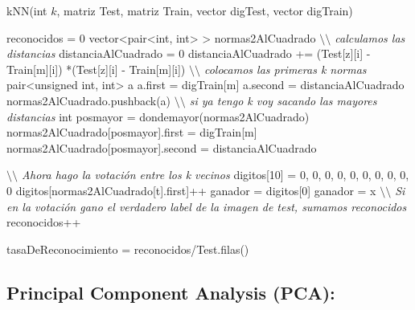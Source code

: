 \begin{algorithm}[H]
\caption{kNN(int $k$, matriz Test, matriz Train, vector digTest, vector digTrain)}
\begin{algorithmic}[1]
\State reconocidos = 0
	\State vector<pair<int, int> > normas2AlCuadrado	
		\State \textit{$\setminus\setminus$ calculamos las distancias}
		\State distanciaAlCuadrado = 0
			\State distanciaAlCuadrado += (Test[z][i] - Train[m][i]) *(Test[z][i] - Train[m][i])
		\EndFor
		 \State \textit{$\setminus\setminus$ colocamos las primeras k normas}
			\State pair<unsigned int, int> a
            \State a.first =  digTrain[m]
            \State a.second = distanciaAlCuadrado
            \State normas2AlCuadrado.pushback(a)
         \Else
         			\State \textit{$\setminus\setminus$  si ya tengo k voy sacando las mayores distancias}
         		    \State int posmayor = dondemayor(normas2AlCuadrado)
                    \State normas2AlCuadrado[posmayor].first = digTrain[m]
                    \State normas2AlCuadrado[posmayor].second = distanciaAlCuadrado
             \EndIf
         \EndIf

	\EndFor
	
\EndFor
\State \textit{$\setminus\setminus$  Ahora hago la votación entre los k vecinos}
\State digitos[10] = { 0, 0, 0, 0, 0, 0, 0, 0, 0, 0 }
	\State digitos[normas2AlCuadrado[t].first]++
\EndFor
\State ganador = digitos[0]
				\State  ganador = x
			\EndIf
\EndFor
\State \textit{$\setminus\setminus$  Si en la votación gano el verdadero label de la imagen de test, sumamos reconocidos}
				\State  reconocidos++
\EndIf

\State tasaDeReconocimiento = reconocidos/Test.filas()


\end{algorithmic}
\end{algorithm}

\subsection{Principal Component Analysis (PCA):}


